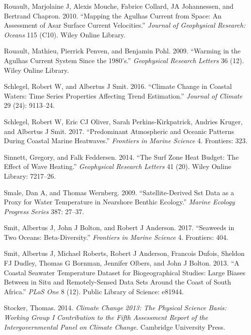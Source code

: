\documentclass[12pt,A4paper,]{article}
\begin{document}
\hypertarget{ref-Rouault2010}{}
Rouault, Marjolaine J, Alexis Mouche, Fabrice Collard, JA Johannessen,
and Bertrand Chapron. 2010. ``Mapping the Agulhas Current from Space: An
Assessment of Asar Surface Current Velocities.'' \emph{Journal of
Geophysical Research: Oceans} 115 (C10). Wiley Online Library.

\hypertarget{ref-Rouault2009}{}
Rouault, Mathieu, Pierrick Penven, and Benjamin Pohl. 2009. ``Warming in
the Agulhas Current System Since the 1980's.'' \emph{Geophysical
Research Letters} 36 (12). Wiley Online Library.

\hypertarget{ref-Schlegel2016}{}
Schlegel, Robert W, and Albertus J Smit. 2016. ``Climate Change in
Coastal Waters: Time Series Properties Affecting Trend Estimation.''
\emph{Journal of Climate} 29 (24): 9113--24.

\hypertarget{ref-Schlegel2017}{}
Schlegel, Robert W, Eric CJ Oliver, Sarah Perkins-Kirkpatrick, Andries
Kruger, and Albertus J Smit. 2017. ``Predominant Atmospheric and Oceanic
Patterns During Coastal Marine Heatwaves.'' \emph{Frontiers in Marine
Science} 4. Frontiers: 323.

\hypertarget{ref-Sinnett2014}{}
Sinnett, Gregory, and Falk Feddersen. 2014. ``The Surf Zone Heat Budget:
The Effect of Wave Heating.'' \emph{Geophysical Research Letters} 41
(20). Wiley Online Library: 7217--26.

\hypertarget{ref-Smale2009}{}
Smale, Dan A, and Thomas Wernberg. 2009. ``Satellite-Derived Sst Data as
a Proxy for Water Temperature in Nearshore Benthic Ecology.''
\emph{Marine Ecology Progress Series} 387: 27--37.

\hypertarget{ref-Smit2017}{}
Smit, Albertus J, John J Bolton, and Robert J Anderson. 2017. ``Seaweeds
in Two Oceans: Beta-Diversity.'' \emph{Frontiers in Marine Science} 4.
Frontiers: 404.

\hypertarget{ref-Smit2013}{}
Smit, Albertus J, Michael Roberts, Robert J Anderson, Francois Dufois,
Sheldon FJ Dudley, Thomas G Bornman, Jennifer Olbers, and John J Bolton.
2013. ``A Coastal Seawater Temperature Dataset for Biogeographical
Studies: Large Biases Between in Situ and Remotely-Sensed Data Sets
Around the Coast of South Africa.'' \emph{PLoS One} 8 (12). Public
Library of Science: e81944.

\hypertarget{ref-Stocker2014}{}
Stocker, Thomas. 2014. \emph{Climate Change 2013: The Physical Science
Basis: Working Group I Contribution to the Fifth Assessment Report of
the Intergovernmental Panel on Climate Change}. Cambridge University
Press.
\end{document}
